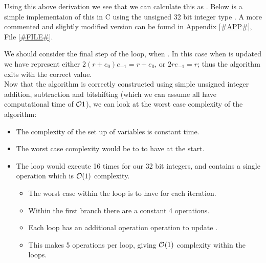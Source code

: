 Using this above derivation we see that we can calculate this as . Below is a simple implementaion of this in C using the unsigned 32 bit integer type . A more commented and slightly modified version can be found in Appendix \ref{#APP#}, File \ref{#FILE#}.


We should consider the final step of the loop, when . In this case when  is updated we have  represent either \(2(r+e_0)e_{-1} = r + e_0\), or \(2re_{-1} = r\); thus the algorithm exits with the correct value.\\

Now that the algorithm is correctly constructed using simple unsigned integer addition, subtraction and bitshifting (which we can assume all have computational time of \(\mathcal{O}{1}\)), we can look at the worst case complexity of the algorithm:

\begin{itemize}
\item The complexity of the set up of variables is constant time.
\item The worst case complexity would be to to have  at the start.
\item The loop would execute 16 times for our 32 bit integers, and contains a single operation which is \(\mathcal{O}(1)\) complexity.
\begin{itemize}
	\item The worst case within the loop is to have  for each iteration.
	\item Within the first  branch there are a constant 4 operations.
	\item Each loop has an additional operation operation to update .
	\item This makes 5 operations per loop, giving \(\mathcal{O}(1)\) complexity within the loops.
\end{itemize}
\end{itemize}


